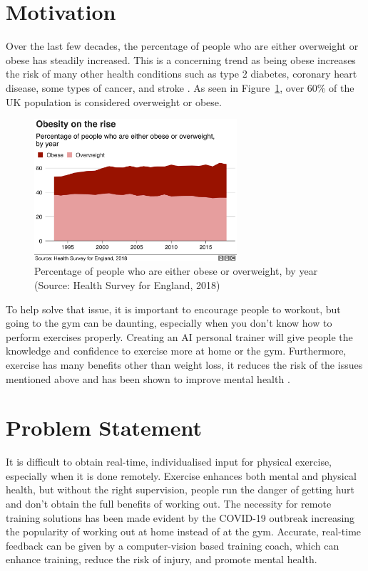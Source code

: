 \section{Motivation}
    Over the last few decades, the percentage of people who are either overweight or obese has steadily increased. This is a concerning trend as being obese increases the risk of many other health conditions such as type 2 diabetes, coronary heart disease, some types of cancer, and stroke \parencite{NHS-obesity}. As seen in Figure~\ref{fig:obesity}, over 60\% of the UK population is considered overweight or obese. \\

    \begin{figure}[htbp]
        \centering
        \includegraphics[width=0.67\textwidth]{figures/obesity.png}
        \caption{Percentage of people who are either obese or overweight, by year (Source: Health Survey for England, 2018)}\label{fig:obesity}
    \end{figure}

    To help solve that issue, it is important to encourage people to workout, but going to the gym can be daunting, especially when you don't know how to perform exercises properly. Creating an AI personal trainer will give people the knowledge and confidence to exercise more at home or the gym. Furthermore, exercise has many benefits other than weight loss, it reduces the risk of the issues mentioned above and has been shown to improve mental health \parencite{NHS-benefits}.\\
    

\section{Problem Statement}
    It is difficult to obtain real-time, individualised input for physical exercise, especially when it is done remotely. Exercise enhances both mental and physical health, but without the right supervision, people run the danger of getting hurt and don't obtain the full benefits of working out. The necessity for remote training solutions has been made evident by the COVID-19 outbreak increasing the popularity of working out at home instead of at the gym. Accurate, real-time feedback can be given by a computer-vision based training coach, which can enhance training, reduce the risk of injury, and promote mental health.

